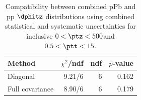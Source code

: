 \begin{table}[htp!]
\centering
\begin{tabular}{|l|r|r|r|}
\hline
Method & $\chi^2$/ndf & ndf & $p$-value \\
\hline
Diagonal & 9.21/6 & 6 & 0.162 \\
Full covariance & 8.90/6 & 6 & 0.179 \\
\hline
\end{tabular}
\caption{Compatibility between combined pPb and pp $\dphitz$ distributions using combined statistical and systematic uncertainties for inclusive $0 < \ptz < 500$\GeV and $0.5 < \ptt < 15$\GeV.}
\label{table:chisq_dphi}
\end{table}
